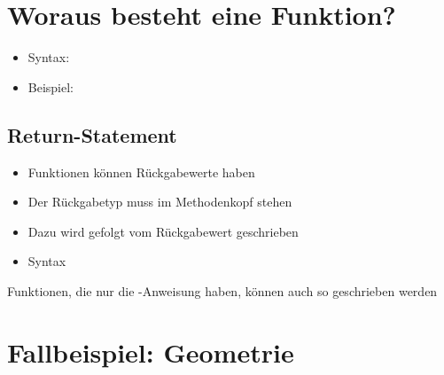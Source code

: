 \subtitle{Kapitel 6: wie Funktionen funktionieren}

\section{Woraus besteht eine Funktion?}
\begin{frame}[c]
    \slidehead
    \begin{itemize}[<+->]
        \item Syntax: 
        \item Beispiel: 
    \end{itemize}
\end{frame}

\subsection{Return-Statement}
\begin{frame}
    \slidehead
    \begin{itemize}
        \item Funktionen können Rückgabewerte haben
        \item Der Rückgabetyp muss im Methodenkopf stehen
        \item Dazu wird  gefolgt vom Rückgabewert geschrieben
            \pause
        \item Syntax 
    \end{itemize}
\end{frame}

\begin{frame}
    \slidehead
    \pause
    Funktionen, die nur die -Anweisung haben, können auch so geschrieben werden
\end{frame}

\livecoding

\subtitle{Kapitel 6: wie Funktionen funktionieren}

\section{Fallbeispiel: Geometrie}
\begin{frame}[c]
    \slidehead

    \begin{figure}
        \centering
    \end{figure}

\end{frame}

